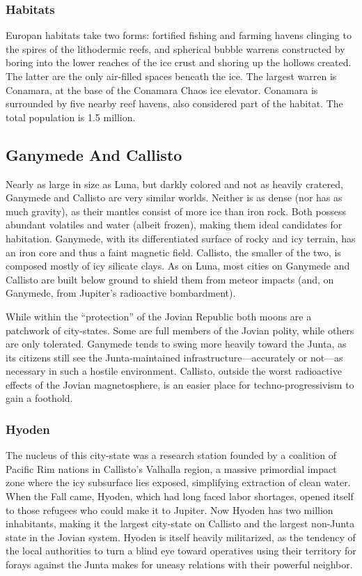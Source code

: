 \subsubsection{Habitats}

Europan habitats take two forms: fortified fishing and 
farming havens clinging to the spires of the lithodermic
reefs, and spherical bubble warrens constructed
by boring into the lower reaches of the ice crust and 
shoring up the hollows created. The latter are the only 
air-filled spaces beneath the ice. The largest warren is 
Conamara, at the base of the Conamara Chaos ice 
elevator. Conamara is surrounded by five nearby reef 
havens, also considered part of the habitat. The total 
population is 1.5 million.

\subsection{Ganymede And Callisto}

Nearly as large in size as Luna, but darkly colored 
and not as heavily cratered, Ganymede and Callisto 
are very similar worlds. Neither is as dense (nor has 
as much gravity), as their mantles consist of more ice 
than iron rock. Both possess abundant volatiles and 
water (albeit frozen), making them ideal candidates 
for habitation. Ganymede, with its differentiated surface
of rocky and icy terrain, has an iron core and thus
a faint magnetic field. Callisto, the smaller of the two, 
is composed mostly of icy silicate clays. As on Luna, 
most cities on Ganymede and Callisto are built below 
ground to shield them from meteor impacts (and, on 
Ganymede, from Jupiter's radioactive bombardment).

While within the ``protection'' of the Jovian Republic
both moons are a patchwork of city-states.
Some are full members of the Jovian polity, while 
others are only tolerated. Ganymede tends to swing 
more heavily toward the Junta, as its citizens still 
see the Junta-maintained infrastructure—accurately 
or not—as necessary in such a hostile environment. 
Callisto, outside the worst radioactive effects of the 
Jovian magnetosphere, is an easier place for techno-progressivism
to gain a foothold.

\subsubsection{Hyoden}

The nucleus of this city-state was a research station 
founded by a coalition of Pacific Rim nations in Callisto's
Valhalla region, a massive primordial impact zone
where the icy subsurface lies exposed, simplifying extraction
of clean water. When the Fall came, Hyoden,
which had long faced labor shortages, opened itself 
to those refugees who could make it to Jupiter. Now 
Hyoden has two million inhabitants, making it the 
largest city-state on Callisto and the largest non-Junta 
state in the Jovian system. Hyoden is itself heavily 
militarized, as the tendency of the local authorities to 
turn a blind eye toward operatives using their territory 
for forays against the Junta makes for uneasy relations 
with their powerful neighbor.

